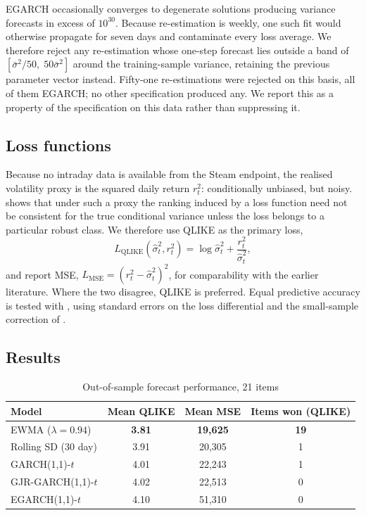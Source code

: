 \documentclass[11pt,a4paper]{article}
\begin{document}
EGARCH occasionally converges to degenerate solutions producing variance
forecasts in excess of $10^{30}$. Because re-estimation is weekly, one such fit
would otherwise propagate for seven days and contaminate every loss average.
We therefore reject any re-estimation whose one-step forecast lies outside a
band of $[\bar{\sigma}^2/50,\; 50\bar{\sigma}^2]$ around the training-sample
variance, retaining the previous parameter vector instead. Fifty-one
re-estimations were rejected on this basis, all of them EGARCH; no other
specification produced any. We report this as a property of the specification
on this data rather than suppressing it.

\subsection{Loss functions}

Because no intraday data is available from the Steam endpoint, the realised
volatility proxy is the squared daily return $r_{t}^2$: conditionally unbiased,
but noisy. \citet{Patton2011} shows that under such a proxy the ranking induced
by a loss function need not be consistent for the true conditional variance
unless the loss belongs to a particular robust class. We therefore use QLIKE
as the primary loss,
\begin{equation}
L_{\text{QLIKE}}(\hat{\sigma}^2_t, r_t^2)
= \log \hat{\sigma}^2_t + \frac{r_t^2}{\hat{\sigma}^2_t},
\end{equation}
and report MSE, $L_{\text{MSE}} = (r_t^2 - \hat{\sigma}^2_t)^2$, for
comparability with the earlier literature. Where the two disagree, QLIKE is
preferred. Equal predictive accuracy is tested with
\citet{DieboldMariano1995}, using \citet{NeweyWest1987} standard errors on the
loss differential and the small-sample correction of \citet{Harvey1997}.

\subsection{Results}

\begin{table}[htbp]
\centering
\caption{Out-of-sample forecast performance, 21 items}
\label{tab:losses}
\begin{tabular}{lccc}
\toprule
Model & Mean QLIKE & Mean MSE & Items won (QLIKE) \\
\midrule
EWMA ($\lambda = 0.94$)  & \textbf{3.81} & \textbf{19{,}625} & \textbf{19} \\
Rolling SD (30 day)      & 3.91 & 20{,}305 & 1 \\
GARCH(1,1)-$t$           & 4.01 & 22{,}243 & 1 \\
GJR-GARCH(1,1)-$t$       & 4.02 & 22{,}513 & 0 \\
EGARCH(1,1)-$t$          & 4.10 & 51{,}310 & 0 \\
\bottomrule
\end{tabular}
\end{table}
\end{document}

